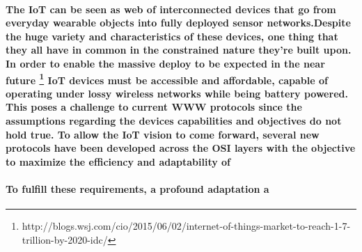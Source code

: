 \paragraph{
The \ac{IoT} can be seen as web of interconnected devices that go from everyday wearable objects into fully deployed sensor networks.Despite the huge variety and characteristics of these devices, one thing that they all have in common in the constrained nature they're built upon. In order to enable the massive deploy to be expected in the near future \footnote{http://blogs.wsj.com/cio/2015/06/02/internet-of-things-market-to-reach-1-7-trillion-by-2020-idc/} \ac{IoT} devices must be accessible and affordable, capable of operating under lossy wireless networks while being battery powered. This poses a challenge to current \ac{WWW} protocols since the assumptions regarding the devices capabilities and objectives do not hold true. To allow the \ac{IoT} vision to come forward, several new protocols have been developed across the OSI layers with the objective to maximize the efficiency and adaptability of 
}
\paragraph{
To fulfill these requirements, a profound adaptation a
}
